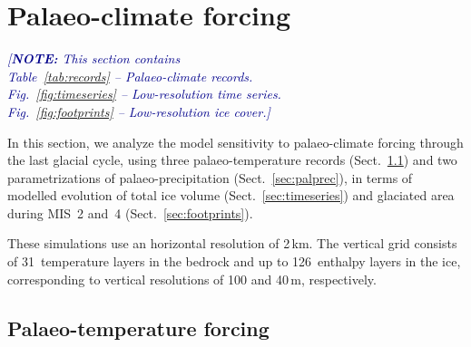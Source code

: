 \documentclass[tc, manuscript]{copernicus}
\newcommand{\note}[1]{\textcolor{darkblue}{\emph{[\textbf{NOTE:} #1]}}}
\begin{document}
\section{Palaeo-climate forcing}
\label{sec:climate}

    \note{This section contains\\
      Table~\ref{tab:records} -- Palaeo-climate records.\\
      Fig.~\ref{fig:timeseries} -- Low-resolution time series.\\
      Fig.~\ref{fig:footprints} -- Low-resolution ice cover.}

    In this section, we analyze the model sensitivity to palaeo-climate forcing
    through the last glacial cycle, using three palaeo-temperature records
    (Sect.~\ref{sec:paltemp}) and two parametrizations of palaeo-precipitation
    (Sect.~\ref{sec:palprec}), in terms of modelled evolution of total ice
    volume (Sect.~\ref{sec:timeseries}) and glaciated area during MIS~2 and~4
    (Sect.~\ref{sec:footprints}).

    These simulations use an horizontal resolution of 2\,km. The vertical grid
    consists of 31~temperature layers in the bedrock and up to 126~enthalpy
    layers in the ice, corresponding to vertical resolutions of 100 and
    40\,\unit{m}, respectively.


\subsection{Palaeo-temperature forcing}
\label{sec:paltemp}
\end{document}
